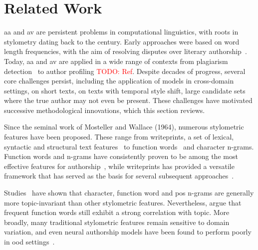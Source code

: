 \label{chap:related_work}
\chapter{Related Work}



\Ac{aa} and \ac{av} are persistent problems in computational linguistics, with roots in stylometry dating back to the  century. 
Early approaches were based on word length frequencies, with the aim of resolving disputes over literary authorship~\citep{neal_surveying_2018,stamatatos_survey_2009}.
Today, \ac{aa} and \ac{av} are applied in a wide range of contexts from plagiarism detection~\citep{stein_intrinsic_2011} to author profiling \textcolor{red}{TODO: Ref}. 
Despite decades of progress, several core challenges persist, including the application of models in cross-domain settings, on short texts, on texts with temporal style shift, large candidate sets where the true author may not even be present. 
These challenges have motivated successive methodological innovations, which this section reviews.

Since the seminal work of Mosteller and Wallace (1964), numerous stylometric features have been proposed.
These range from writeprints, a set of lexical, syntactic and structural text features~\citep{abbasi_writeprints_2008} to function words~\citep{abbasi_writeprints_2008} and character n-grams.
Function words and n-grams have consistently proven to be among the most effective features for authorship~\citep{tyo_state_2022,altakrori_topic_2021,koppel_authorship_2011}, while writeprints has provided a versatile framework that has served as the basis for several subsequent approaches~\citep{weerasinghe_feature_vector_difference_2021}. 

Studies~\citep{stamatatos_survey_2009,barlas_cross_domain_2020} have shown that character, function word and \ac{pos} n-grams are generally more topic-invariant than other stylometric features.
Nevertheless, \citet{bischoff_importance_2020} argue that frequent function words still exhibit a strong correlation with topic.
More broadly, many traditional stylometric features remain sensitive to domain variation, and even neural authorship models have been found to perform poorly in \ac{ood} settings~\citep{rivera_soto_learning_2021}.


